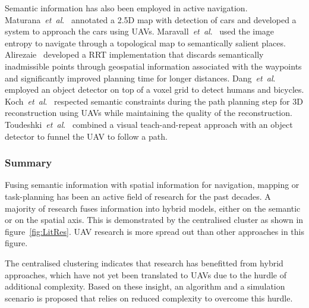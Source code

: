 \documentclass[twocolumn,letterpaper]{IEEEAerospaceCLS}  %
\newcommand{\abbreviation}[1]{\emph{#1}.}
\newcommand{\etal}{\abbreviation{et~al}}
\begin{document}
Semantic information has also been employed in active navigation. Maturana~\etal~\cite{maturana_looking_2017} annotated a 2.5D map with detection of cars and developed a system to approach the cars using UAVs. Maravall~\etal~\cite{maravall_navigation_2017} used the image entropy to navigate through a topological map to semantically salient places. Alirezaie~\cite{alirezaie_exploiting_2017} developed a RRT implementation that discards semantically inadmissible points through geospatial information associated with the waypoints and significantly improved planning time for longer distances. Dang~\etal~\cite{dang_autonomous_2018} employed an object detector on top of a voxel grid to detect humans and bicycles. Koch~\etal~\cite{koch_automatic_2019} respected semantic constraints during the path planning step for 3D reconstruction using UAVs while maintaining the quality of the reconstruction.
Toudeshki~\etal~\cite{toudeshki_robust_2018} combined a visual teach-and-repeat approach with an object detector to funnel the UAV to follow a path.
\subsubsection{Summary} \label{sssec:ResLitSum}
Fusing semantic information with spatial information for navigation, mapping or task-planning has been an active field of research for the past decades. A majority of research fuses information into hybrid models, either on the semantic or on the spatial axis. This is demonstrated by the centralised cluster as shown in figure~\ref{fig:LitRes}. UAV research is more spread out than other approaches in this figure.

The centralised clustering indicates that research has benefitted from hybrid approaches, which have not yet been translated to UAVs due to the hurdle of additional complexity. Based on these insight, an algorithm and a simulation scenario is proposed that relies on reduced complexity to overcome this hurdle.
\end{document}
